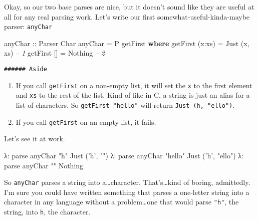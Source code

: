 \documentclass[]{article}
\newenvironment{Shaded}{}{}
\newcommand{\KeywordTok}[1]{\textcolor[rgb]{0.00,0.44,0.13}{\textbf{{#1}}}}
\newcommand{\DataTypeTok}[1]{\textcolor[rgb]{0.56,0.13,0.00}{{#1}}}
\newcommand{\CharTok}[1]{\textcolor[rgb]{0.25,0.44,0.63}{{#1}}}
\newcommand{\StringTok}[1]{\textcolor[rgb]{0.25,0.44,0.63}{{#1}}}
\newcommand{\CommentTok}[1]{\textcolor[rgb]{0.38,0.63,0.69}{\textit{{#1}}}}
\newcommand{\OtherTok}[1]{\textcolor[rgb]{0.00,0.44,0.13}{{#1}}}
\newcommand{\FunctionTok}[1]{\textcolor[rgb]{0.02,0.16,0.49}{{#1}}}
\newcommand{\NormalTok}[1]{{#1}}
\begin{document}
Okay, so our two base parses are nice, but it doesn't sound like they
are useful at all for any real parsing work. Let's write our first
somewhat-useful-kinda-maybe parser: \texttt{anyChar}

\begin{Shaded}
\begin{Highlighting}[]
\OtherTok{anyChar ::} \DataTypeTok{Parser} \DataTypeTok{Char}
\NormalTok{anyChar }\FunctionTok{=} \DataTypeTok{P} \NormalTok{getFirst}
    \KeywordTok{where}
        \NormalTok{getFirst (x}\FunctionTok{:}\NormalTok{xs) }\FunctionTok{=} \DataTypeTok{Just} \NormalTok{(x, xs)          }\CommentTok{-- 1}
        \NormalTok{getFirst []     }\FunctionTok{=} \DataTypeTok{Nothing}               \CommentTok{-- 2}
\end{Highlighting}
\end{Shaded}

\begin{verbatim}
###### Aside
\end{verbatim}

\begin{enumerate}
\def\labelenumi{\arabic{enumi}.}
\tightlist
\item
  If you call \texttt{getFirst} on a non-empty list, it will set the
  \texttt{x} to the first element and \texttt{xs} to the rest of the
  list. Kind of like in C, a string is just an alias for a list of
  characters. So \texttt{getFirst\ "hello"} will return
  \texttt{Just\ (\textquotesingle{}h\textquotesingle{},\ "ello")}.
\item
  If you call \texttt{getFirst} on an empty list, it fails.
\end{enumerate}

Let's see it at work.

\begin{Shaded}
\begin{Highlighting}[]
\NormalTok{λ}\FunctionTok{:} \NormalTok{parse anyChar }\StringTok{"h"}
\DataTypeTok{Just} \NormalTok{(}\CharTok{'h'}\NormalTok{, }\StringTok{""}\NormalTok{)}
\NormalTok{λ}\FunctionTok{:} \NormalTok{parse anyChar }\StringTok{"hello"}
\DataTypeTok{Just} \NormalTok{(}\CharTok{'h'}\NormalTok{, }\StringTok{"ello"}\NormalTok{)}
\NormalTok{λ}\FunctionTok{:} \NormalTok{parse anyChar }\StringTok{""}
\DataTypeTok{Nothing}
\end{Highlighting}
\end{Shaded}

So \texttt{anyChar} parses a string into a\ldots{}character.
That's\ldots{}kind of boring, admittedly. I'm sure you could have
written something that parses a one-letter string into a character in
any language without a problem\ldots{}one that would parse \texttt{"h"},
the string, into \texttt{\textquotesingle{}h\textquotesingle{}}, the
character.
\end{document}
